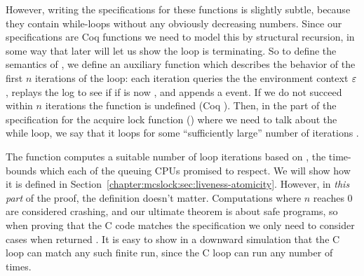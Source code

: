 However, writing the specifications for these functions is slightly subtle, 
because they contain
while-loops without any obviously decreasing numbers. Since our
specifications are Coq functions we need to model this by structural
recursion, in some way that later will let us show the loop is terminating.
So to define the semantics of ,
we define an auxiliary function
 which describes the
behavior of the first $n$ iterations of the loop: each iteration
queries the the environment context ${\varepsilon}$, replays the log to see if if  is now , and appends a  event.
If we do not succeed within $n$ iterations the function is undefined (Coq ).
Then, in the part of the  specification for the  acquire lock 
function () where we need to talk about the while loop,
we say that it loops for some ``sufficiently large'' 
number of iterations . 

The function  computes a suitable 
number of loop iterations based on , the time-bounds  which each of the queuing CPUs promised to respect.
We will show how it is defined in Section~\ref{chapter:mcslock:sec:liveness-atomicity}. 
However, in \emph{this part} of the proof, the definition doesn't matter. 
Computations where $n$ reaches 0 are considered crashing, and our
ultimate theorem is about safe programs, so when proving that the C
code matches the specification we only need to 
consider cases when  returned .
It is easy to show in a downward simulation that the C loop can match any such finite run, 
since the C loop can run any number of times.
%
%
%
%
